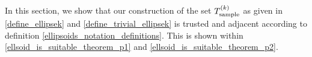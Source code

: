 In this section, we show that our construction of the set ${T_{\text{sample}}^{(k)}}$ as given in 
\cref{define_ellipsek} and \cref{define_trivial_ellipsek}
is trusted and adjacent according to definition \cref{ellipsoids_notation_definitions}.
This is shown within \cref{ellsoid_is_suitable_theorem_p1} and \cref{ellsoid_is_suitable_theorem_p2}.



